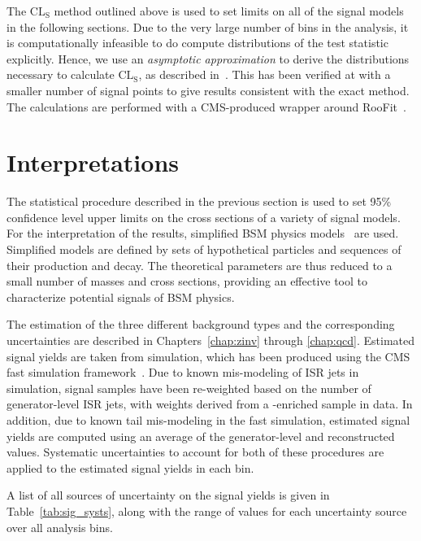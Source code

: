 The $\text{CL}_\text{S}$ method outlined above is used to set limits on all of the signal models in the following
sections. Due to the very large number of bins in the \mttwo analysis, it is computationally infeasible
to do compute distributions of the test statistic explicitly. Hence, we use an \textit{asymptotic approximation} to
derive the distributions necessary to calculate $\text{CL}_\text{S}$, as described in~\cite{Cowan:asymptotic}.
This has been verified at with a smaller number of signal points to give results consistent with the exact method.
The calculations are performed with a CMS-produced wrapper around RooFit~\cite{roofit}.

\section{Interpretations}
\label{sec:interp}

The statistical procedure described in the previous section is used to set 95\% confidence level upper limits
on the cross sections of a variety of signal models. 
For the interpretation of the results, simplified BSM physics models~\cite{Alwall:sms,Alwall:jetmet,Alves:sms} are used. 
Simplified models are defined by sets of hypothetical particles and sequences of their production
and decay. The theoretical parameters are thus reduced to a small number of masses and cross
sections, providing an effective tool to characterize potential signals of BSM physics.

The estimation of the three different background types
and the corresponding uncertainties are described in Chapters~\ref{chap:zinv} through \ref{chap:qcd}.
Estimated signal yields are taken from simulation, which has been produced using the CMS fast simulation
framework~\cite{CMS:fastsim}. Due to known mis-modeling of ISR jets in simulation, signal samples
have been re-weighted based on the number of generator-level ISR jets, with weights derived from a
\ttbar-enriched sample in data. In addition, due to known \ptmiss tail mis-modeling in the fast simulation,
estimated signal yields are computed using an average of the generator-level and reconstructed \ptmiss
values. Systematic uncertainties to account for both of these procedures are applied to the estimated
signal yields in each bin.

A list of all sources of uncertainty on the signal yields is given in Table~\ref{tab:sig_systs}, along
with the range of values for each uncertainty source over all analysis bins.

